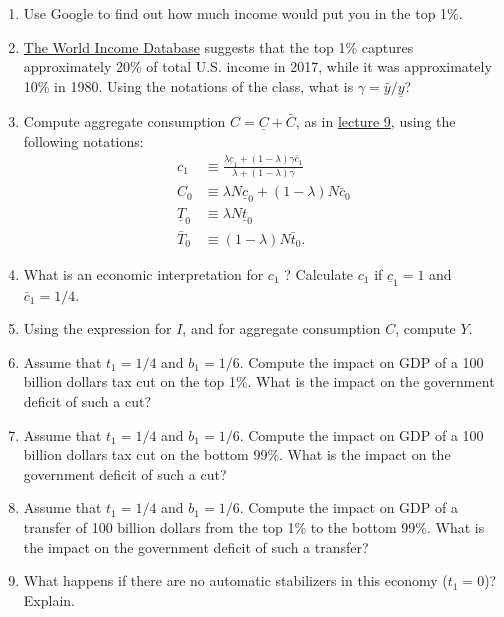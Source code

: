 \documentclass[]{book}
\theoremstyle{definition}
\theoremstyle{definition}
\theoremstyle{definition}
\theoremstyle{remark}
\begin{document}
\begin{enumerate}
\def\labelenumi{\arabic{enumi}.}
\item
  Use Google to find out how much income would put you in the top 1\%.
\item
  \href{https://wid.world/world/\#sptinc_p99p100_z/US;FR;DE;CN;ZA;GB;WO/last/eu/k/p/yearly/s/false/4.8255/30/curve/false/country}{The
  World Income Database} suggests that the top 1\% captures
  approximately 20\% of total U.S. income in 2017, while it was
  approximately 10\% in 1980. Using the notations of the class, what is
  \(\gamma=\bar{y}/\underline{y}\)?
\item
  Compute aggregate consumption \(C= \underline{C} + \bar{C}\), as in
  \protect\hyperlink{redistributive}{lecture 9}, using the following
  notations: \[
  \begin{aligned}
  c_{1}&\equiv\frac{\lambda\underline{c}_{1}+\left(1-\lambda\right)\gamma\bar{c}_{1}}{\lambda+(1-\lambda)\gamma}\\
  C_{0}& \equiv \lambda  N \underline{c}_0 + (1-\lambda) N \bar{c}_0\\
  \underline{T}_{0}& \equiv \lambda  N \underline{t}_0\\
  \bar{T}_0 & \equiv (1-\lambda) N \bar{t}_0.
  \end{aligned}
  \]
\item
  What is an economic interpretation for \(c_1\) ? Calculate \(c_1\) if
  \(\underline{c}_1=1\) and \(\bar{c}_1=1/4\).
\item
  Using the expression for \(I\), and for aggregate consumption \(C\),
  compute \(Y\).
\item
  Assume that \(t_1=1/4\) and \(b_1=1/6\). Compute the impact on GDP of
  a 100 billion dollars tax cut on the top 1\%. What is the impact on
  the government deficit of such a cut?
\item
  Assume that \(t_1=1/4\) and \(b_1=1/6\). Compute the impact on GDP of
  a 100 billion dollars tax cut on the bottom 99\%. What is the impact
  on the government deficit of such a cut?
\item
  Assume that \(t_1=1/4\) and \(b_1=1/6\). Compute the impact on GDP of
  a transfer of 100 billion dollars from the top 1\% to the bottom 99\%.
  What is the impact on the government deficit of such a transfer?
\item
  What happens if there are no automatic stabilizers in this economy
  (\(t_1 = 0\))? Explain.
\end{enumerate}
\end{document}
